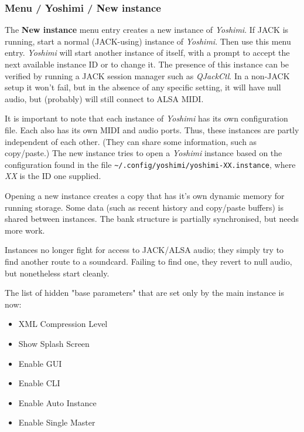 \subsubsection{Menu / Yoshimi / New instance}
\label{subsubsec:menu_yoshimi_new_instance}

   The \textbf{New instance} menu entry creates a new instance of
   \textsl{Yoshimi}.  If JACK is running, start a normal (JACK-using) instance
   of \textsl{Yoshimi}.  Then use this menu entry.  \textsl{Yoshimi} will start
   another instance of itself, with a prompt to accept the next available
   instance ID or to change it.  The presence of this instance can be verified
   by running a JACK session manager such as \textsl{QJackCtl}.
   In a non-JACK setup it won't fail, but in the absence of any specific
   setting, it will have null audio, but (probably) will still connect to ALSA
   MIDI.

   It is important to note that each instance of \textsl{Yoshimi} has its
   own configuration file.  Each also has its own MIDI and audio ports.
   Thus, these instances are partly independent of each other.
   (They can share some information, such as copy/paste.)
   The new instance tries to open a \textsl{Yoshimi} instance based on the
   configuration found in the file
   \texttt{\textasciitilde/.config/\-yoshimi/\-yoshimi-XX.instance}, where
   \textsl{XX} is the ID one supplied.

   Opening a new instance creates a copy that has it's own dynamic memory for
   running storage. Some data (such as recent history and copy/paste buffers) is
   shared between instances.
   The bank structure is partially synchronised, but needs more work.


   Instances no longer fight for access to JACK/ALSA audio; they simply
   try to find another route to a soundcard. Failing to find one,
   they revert to null audio, but nonetheless start cleanly.

   The list of hidden "base parameters" that are set only by the main instance
   is now:

   \begin{itemize}
      \item XML Compression Level
      \item Show Splash Screen
      \item Enable GUI
      \item Enable CLI
      \item Enable Auto Instance
      \item Enable Single Master
   \end{itemize}

